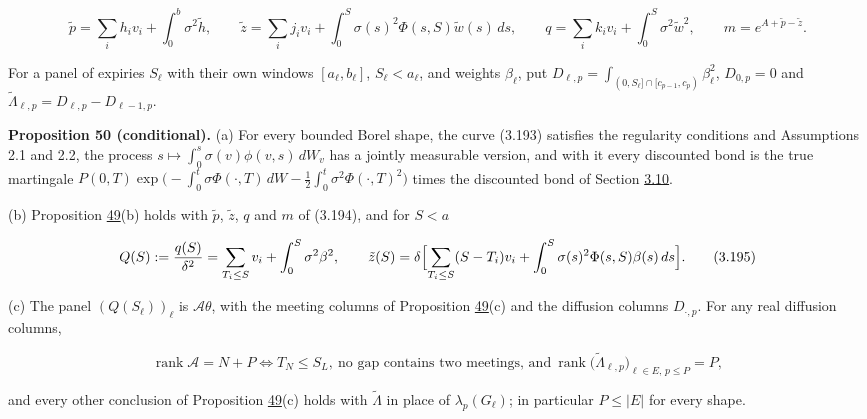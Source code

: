 \documentclass[11pt]{article}
\begin{document}
\begin{equation*}
\tilde p=\sum_ih_iv_i+\int_0^b\sigma^2\tilde h,\qquad\tilde z=\sum_ij_iv_i+\int_0^S\sigma(s)^2\Phi(s,S)\tilde w(s)\,ds,\qquad q=\sum_ik_iv_i+\int_0^S\sigma^2\tilde w^2,\qquad m=e^{A+\tilde p-\tilde z}. \tag{3.194}\label{eq:3.194}
\end{equation*}

For a panel of expiries \(S_\ell\) with their own windows \([a_\ell,b_\ell]\), \(S_\ell<a_\ell\), and weights \(\beta_\ell\), put \(D_{\ell,p}=\int_{(0,S_\ell]\cap[c_{p-1},c_p)}\beta_\ell^2\), \(D_{0,p}=0\) and \(\tilde\Lambda_{\ell,p}=D_{\ell,p}-D_{\ell-1,p}\).

\label{res:Proposition-50}
\textbf{Proposition 50 (conditional).} (a) For every bounded Borel shape, the curve (3.193) satisfies the regularity conditions and Assumptions 2.1 and 2.2, the process \(s\mapsto\int_0^s\sigma(v)\phi(v,s)\,dW_v\) has a jointly measurable version, and with it every discounted bond is the true martingale
\(P(0,T)\exp\bigl(-\int_0^t\sigma\Phi(\cdot,T)\,dW-\tfrac12\int_0^t\sigma^2\Phi(\cdot,T)^2\bigr)\) times the discounted bond of Section \hyperref[sec:3.10]{3.10}.

(b) Proposition \hyperref[res:Proposition-49]{49}(b) holds with \(\tilde p\), \(\tilde z\), \(q\) and \(m\) of (3.194), and for \(S<a\)

\begin{equation*}
Q(S):=\frac{q(S)}{\delta^2}=\sum_{T_i\le S}v_i+\int_0^S\sigma^2\beta^2,\qquad\tilde z(S)=\delta\Bigl[\sum_{T_i\le S}(S-T_i)v_i+\int_0^S\sigma(s)^2\Phi(s,S)\beta(s)\,ds\Bigr]. \tag{3.195}\label{eq:3.195}
\end{equation*}

(c) The panel \((Q(S_\ell))_\ell\) is \(\mathcal A\theta\), with the meeting columns of Proposition \hyperref[res:Proposition-49]{49}(c) and the diffusion columns \(D_{\cdot,p}\). For any real diffusion columns,

\begin{equation*}
\operatorname{rank}\mathcal A=N+P\iff T_N\le S_L,\ \text{no gap contains two meetings, and}\ \operatorname{rank}\bigl(\tilde\Lambda_{\ell,p}\bigr)_{\ell\in E,\,p\le P}=P, \tag{3.196}\label{eq:3.196}
\end{equation*}

and every other conclusion of Proposition \hyperref[res:Proposition-49]{49}(c) holds with \(\tilde\Lambda\) in place of \(\lambda_p(G_\ell)\); in particular \(P\le|E|\) for every shape.
\end{document}
